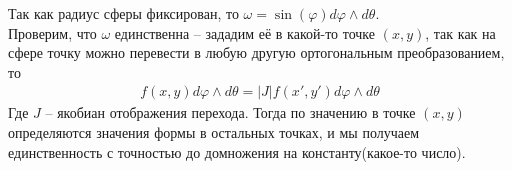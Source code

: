 	Так как радиус сферы фиксирован, то $\omega = \sin(\varphi) d \varphi \wedge d \theta$.\\
	Проверим, что $\omega$ единственна -- зададим её в какой-то точке $\left(x,y\right)$, так как на сфере точку можно перевести в любую другую ортогональным преобразованием, то 
	\begin{gather*}
	f\left(x,y\right) d \varphi \wedge d \theta =
	|J| f\left(x',y'\right) d \varphi \wedge d \theta
	\end{gather*}
	Где $J$ -- якобиан отображения перехода. Тогда по значению в точке $\left(x,y\right)$ определяются значения формы в остальных точках, и мы получаем единственность с точностью до домножения на константу(какое-то число).
\vskip 0.4in
\begin{comment}
Пусть $SO(3)$ действует поворотом на угол $\alpha$ вокруг оси $e_z$, то есть
\begin{gather*}
\begin{pmatrix}
x' \\ y' \\ z'
\end{pmatrix}
=
\begin{pmatrix}
\cos(\alpha) & -\sin(\alpha) & 0\\
\sin(\alpha) & \cos(\alpha) & 0\\
0 & 0 & 1
\end{pmatrix}
\begin{pmatrix}
x \\ y \\ z
\end{pmatrix}
\end{gather*}
$n$-форма инвариантна если $fw = w$, рассмотрим $w = dx \wedge dy$
\begin{gather*}
fw =
\left(\sum\limits_{i_1 = 1}^{n} \frac{\partial f_2}{\partial x_{i_2}} dx_{i_2}\right) \wedge \left(\sum\limits_{i_1 = 1}^{n} \frac{\partial f_2}{\partial x_{i_2}} dx_{i_2}\right) =
\left(\frac{\partial f_2}{\partial x} \frac{\partial f_2}{\partial y} - \frac{\partial f_1}{\partial y} \frac{\partial f_2}{\partial x}\right)dx \wedge dy =
dx \wedge dy\\
f_i = x_i'\ i = 1,2,3
\end{gather*}
Эта форма инварианта относительно действий группы $SO(3)$, а следовательно она на всей сфере одинакова, то есть единственная.
\end{comment}


